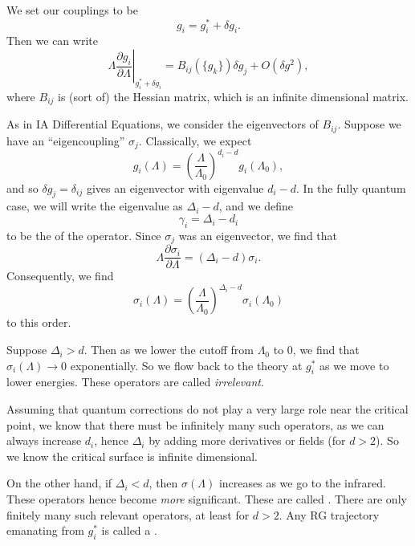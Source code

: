 \documentclass[a4paper]{article}
\begin{document}
We set our couplings to be
\[
  g_i = g_i^* + \delta g_i.
\]
Then we can write
\[
  \left.\Lambda \frac{\partial g_i}{\partial \Lambda} \right|_{g_i^* + \delta g_i} = B_{ij} (\{g_k\}) \delta g_j + O(\delta g^2),
\]
where $B_{ij}$ is (sort of) the Hessian matrix, which is an infinite dimensional matrix.

As in IA Differential Equations, we consider the eigenvectors of $B_{ij}$. Suppose we have an ``eigencoupling'' $\sigma_j$. Classically, we expect
\[
  g_i(\Lambda) = \left(\frac{\Lambda}{\Lambda_0}\right)^{d_i - d} g_i(\Lambda_0),
\]
and so $\delta g_j = \delta_{ij}$ gives an eigenvector with eigenvalue $d_i - d$. In the fully quantum case, we will write the eigenvalue as $\Delta_i - d$, and we define
\[
  \gamma_i = \Delta_i - d_i
\]
to be the  of the operator. Since $\sigma_j$ was an eigenvector, we find that
\[
  \Lambda \frac{\partial \sigma_i}{\partial \Lambda} = (\Delta_i - d) \sigma_i.
\]
Consequently, we find
\[
  \sigma_i(\Lambda) = \left(\frac{\Lambda}{\Lambda_0}\right)^{\Delta_i - d} \sigma_i(\Lambda_0)
\]
to this order.

Suppose $\Delta_i > d$. Then as we lower the cutoff from $\Lambda_0$ to $0$, we find that $\sigma_i(\Lambda) \to 0$ exponentially. So we flow back to the theory at $g_i^*$ as we move to lower energies. These operators are called \emph{irrelevant}.

Assuming that quantum corrections do not play a very large role near the critical point, we know that there must be infinitely many such operators, as we can always increase $d_i$, hence $\Delta_i$ by adding more derivatives or fields (for $d > 2$). So we know the critical surface is infinite dimensional.

On the other hand, if $\Delta_i < d$, then $\sigma(\Lambda)$ increases as we go to the infrared. These operators hence become \emph{more} significant. These are called . There are only finitely many such relevant operators, at least for $d > 2$. Any RG trajectory emanating from $g_i^*$ is called a .
\end{document}
